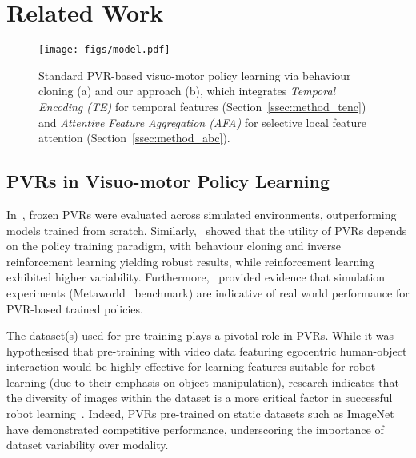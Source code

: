 \section{Related Work}
\begin{figure*}[!t]
\begin{center}
\centerline{\texttt{[image: figs/model.pdf]}}
\vspace{-10pt}
\caption{Standard PVR-based visuo-motor policy learning via behaviour cloning (a) and our approach (b), which integrates \emph{Temporal Encoding (TE)} for temporal features (Section~\ref{ssec:method_tenc}) and \emph{Attentive Feature Aggregation (AFA)} for selective local feature attention (Section~\ref{ssec:method_abc}).}
\label{fig:model}
\end{center}
\vspace{-15pt}
\end{figure*}

\subsection{PVRs in Visuo-motor Policy Learning}
In~\cite{parisi2022unsurprising}, frozen PVRs were evaluated across simulated environments, outperforming models trained from scratch. %
Similarly,~\cite{hu2023pretrainedvisionmodelsmotor} showed that the utility of PVRs depends on the policy training paradigm, with behaviour cloning and inverse reinforcement learning yielding robust results, while reinforcement learning exhibited higher variability. 
Furthermore,~\cite{silwal2024large} provided evidence that simulation experiments (\eg Metaworld~\cite{yu2020meta} benchmark) are indicative of real world performance for PVR-based trained policies. 

The dataset(s) used for pre-training plays a pivotal role in PVRs. 
While it was hypothesised that pre-training with video data featuring egocentric human-object interaction would be highly effective for learning features suitable for robot learning (due to their emphasis on object manipulation), research indicates that the diversity of images within the dataset is a more critical factor in successful robot learning~\cite{dasari2023datasets, NEURIPS2023_022ca1be}. 
Indeed, PVRs pre-trained on static datasets such as ImageNet~\cite{ridnik2021imagenet21kpretrainingmasses} have demonstrated competitive performance, underscoring the importance of dataset variability over modality. 

